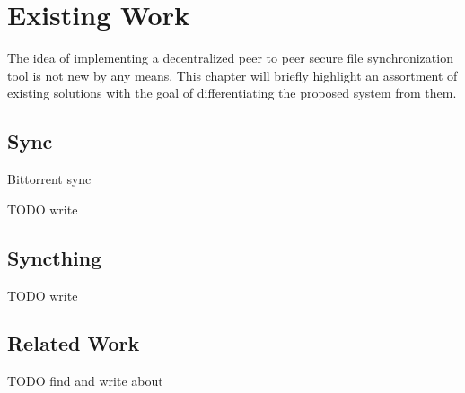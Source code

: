\chapter{Existing Work}

The idea of implementing a decentralized peer to peer secure file synchronization tool is not new by any means.
This chapter will briefly highlight an assortment of existing solutions with the goal of differentiating the proposed system from them.

\section{Sync}

Bittorrent sync

TODO write

\section{Syncthing}

TODO write

\section{Related Work}

TODO find and write about
